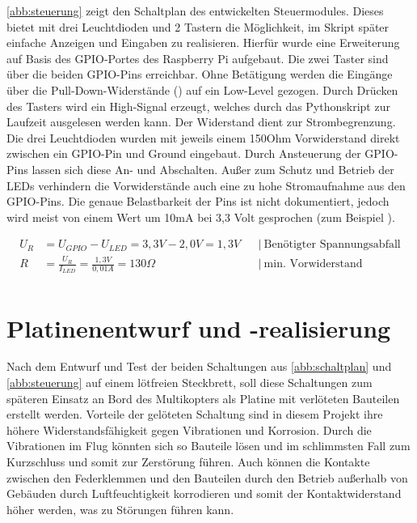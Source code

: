 \documentclass[a4paper,12pt,bibliography=totoc, listof=totoc,titlepage,pointlessnumbers]{scrreprt}
\begin{document}
\autoref{abb:steuerung} zeigt den Schaltplan des entwickelten Steuermodules. Dieses bietet mit drei Leuchtdioden und 2 Tastern die Möglichkeit, im Skript später einfache Anzeigen und Eingaben zu realisieren. Hierfür wurde eine Erweiterung auf Basis des GPIO-Portes des Raspberry Pi aufgebaut. Die zwei Taster sind über die beiden GPIO-Pins  erreichbar. Ohne Betätigung werden die Eingänge über die Pull-Down-Widerstände () auf ein Low-Level gezogen. Durch Drücken des Tasters wird ein High-Signal erzeugt, welches durch das Pythonskript zur Laufzeit ausgelesen werden kann. Der Widerstand  dient zur Strombegrenzung.
Die drei Leuchtdioden wurden mit jeweils einem 150Ohm Vorwiderstand direkt zwischen ein GPIO-Pin und Ground eingebaut. Durch Ansteuerung der GPIO-Pins lassen sich diese An- und Abschalten. Außer zum Schutz und Betrieb der LEDs verhindern die Vorwiderstände auch eine zu hohe Stromaufnahme aus den GPIO-Pins. Die genaue Belastbarkeit der Pins ist nicht dokumentiert, jedoch wird meist von einem Wert um 10mA bei 3,3 Volt gesprochen (zum Beispiel \citet{ekRaspPin}).

\begin{equation}
\begin{aligned}
U_R &= U_{GPIO} - U_{LED} = 3,3V - 2,0V = 1,3V    && \left|\  \text{Benötigter Spannungsabfall} \right. \\
R &= \frac{U_R}{I_{LED}} = \frac{1,3V}{0,01A} = 130\Omega   && \left|\  \text{min. Vorwiderstand} \right. \\
\end{aligned}
\label{eq:vorwiderstand}
\end{equation}

\section{Platinenentwurf und -realisierung}
Nach dem Entwurf und Test der beiden Schaltungen aus \autoref{abb:schaltplan} und \autoref{abb:steuerung} auf einem lötfreien Steckbrett, soll diese Schaltungen zum späteren Einsatz an Bord des Multikopters als Platine mit verlöteten Bauteilen erstellt werden. Vorteile der gelöteten Schaltung sind in diesem Projekt ihre höhere Widerstandsfähigkeit gegen Vibrationen und Korrosion. Durch die Vibrationen im Flug könnten sich so Bauteile lösen und im schlimmsten Fall zum Kurzschluss und somit zur Zerstörung führen. Auch können die Kontakte zwischen den Federklemmen und den Bauteilen durch den Betrieb außerhalb von Gebäuden durch Luftfeuchtigkeit korrodieren und somit der Kontaktwiderstand höher werden, was zu Störungen führen kann.
\end{document}

